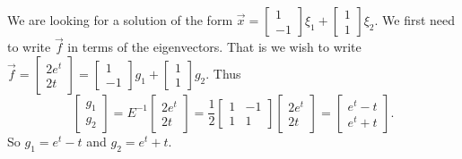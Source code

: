 \begin{example}
We are looking for a solution of the form $\vec{x} = 
\left[ \begin{smallmatrix}
1 \\
-1
\end{smallmatrix} \right] \xi_1 +
\left[ \begin{smallmatrix}
1 \\
1
\end{smallmatrix} \right] \xi_2$.  We first need to write $\vec{f}$
in terms of the eigenvectors.
That is we wish to write $\vec{f} = 
\left[ \begin{smallmatrix}
2e^t \\
2t
\end{smallmatrix} \right] = 
\left[ \begin{smallmatrix}
1 \\
-1
\end{smallmatrix} \right] g_1 +
\left[ \begin{smallmatrix}
1 \\
1
\end{smallmatrix} \right] g_2$.  Thus
\begin{equation*}
\begin{bmatrix}
g_1 \\
g_2
\end{bmatrix} = 
E^{-1}
\begin{bmatrix}
2e^t \\
2t
\end{bmatrix}
=
\frac{1}{2}
\begin{bmatrix}
1 & -1 \\
1 & 1
\end{bmatrix}
\begin{bmatrix}
2e^t \\
2t
\end{bmatrix}
=
\begin{bmatrix}
e^t-t \\
e^t+t
\end{bmatrix} .
\end{equation*}
So $g_1 = e^t-t$ and $g_2 = e^t+t$.


\end{example}
